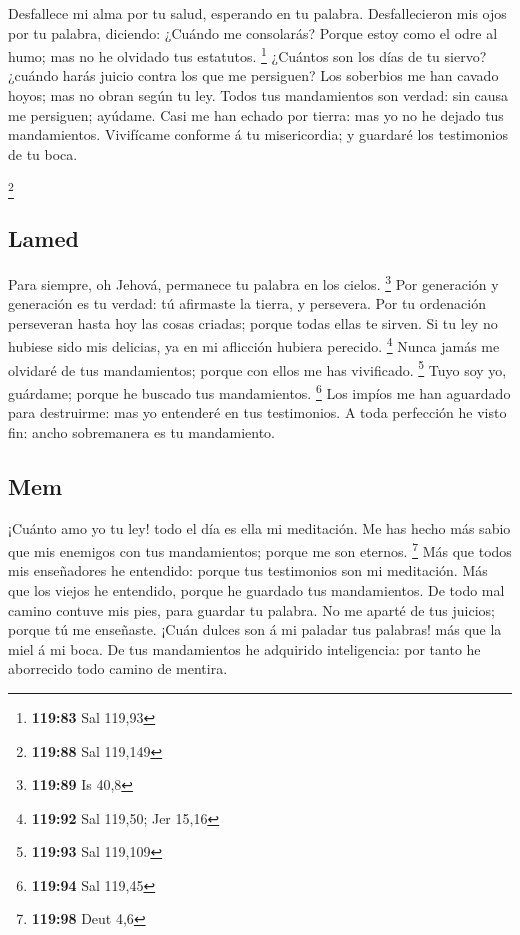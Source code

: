  Desfallece mi alma por tu salud, esperando en tu palabra.
 Desfallecieron mis ojos por tu palabra, diciendo: ¿Cuándo
me consolarás?  Porque estoy como el odre al humo; mas no
he olvidado tus estatutos. \footnote{\textbf{119:83} Sal 119,93}
 ¿Cuántos son los días de tu siervo? ¿cuándo harás juicio
contra los que me persiguen?  Los soberbios me han cavado
hoyos; mas no obran según tu ley.  Todos tus mandamientos
son verdad: sin causa me persiguen; ayúdame.  Casi me han
echado por tierra: mas yo no he dejado tus mandamientos. 
Vivifícame conforme á tu misericordia; y guardaré los testimonios de tu
boca.

\footnote{\textbf{119:88} Sal 119,149}

\hypertarget{lamed}{%
\subsection{Lamed}\label{lamed}}

 Para siempre, oh Jehová, permanece tu palabra en los
cielos. \footnote{\textbf{119:89} Is 40,8}  Por generación
y generación es tu verdad: tú afirmaste la tierra, y persevera.
 Por tu ordenación perseveran hasta hoy las cosas criadas;
porque todas ellas te sirven.  Si tu ley no hubiese sido
mis delicias, ya en mi aflicción hubiera perecido. \footnote{\textbf{119:92}
  Sal 119,50; Jer 15,16}  Nunca jamás me olvidaré de tus
mandamientos; porque con ellos me has vivificado. \footnote{\textbf{119:93}
  Sal 119,109}  Tuyo soy yo, guárdame; porque he buscado
tus mandamientos. \footnote{\textbf{119:94} Sal 119,45} 
Los impíos me han aguardado para destruirme: mas yo entenderé en tus
testimonios.  A toda perfección he visto fin: ancho
sobremanera es tu mandamiento.

\hypertarget{mem}{%
\subsection{Mem}\label{mem}}

 ¡Cuánto amo yo tu ley! todo el día es ella mi meditación.
 Me has hecho más sabio que mis enemigos con tus
mandamientos; porque me son eternos. \footnote{\textbf{119:98} Deut 4,6}
 Más que todos mis enseñadores he entendido: porque tus
testimonios son mi meditación.  Más que los viejos he
entendido, porque he guardado tus mandamientos.  De todo
mal camino contuve mis pies, para guardar tu palabra.  No
me aparté de tus juicios; porque tú me enseñaste.  ¡Cuán
dulces son á mi paladar tus palabras! más que la miel á mi boca.
 De tus mandamientos he adquirido inteligencia: por tanto
he aborrecido todo camino de mentira.

